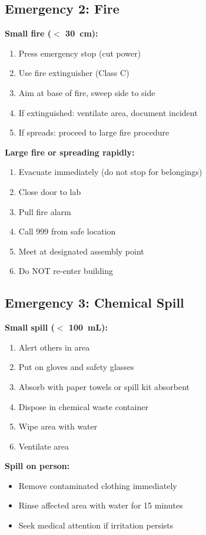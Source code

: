 \documentclass[11pt]{article}
\begin{document}
\subsection{Emergency 2: Fire}

\textbf{Small fire ($<$ 30~cm):}

\begin{enumerate}
\item Press emergency stop (cut power)
\item Use fire extinguisher (Class C)
\item Aim at base of fire, sweep side to side
\item If extinguished: ventilate area, document incident
\item If spreads: proceed to large fire procedure
\end{enumerate}

\textbf{Large fire or spreading rapidly:}

\begin{enumerate}
\item Evacuate immediately (do not stop for belongings)
\item Close door to lab
\item Pull fire alarm
\item Call 999 from safe location
\item Meet at designated assembly point
\item Do NOT re-enter building
\end{enumerate}

\subsection{Emergency 3: Chemical Spill}

\textbf{Small spill ($<$ 100~mL):}

\begin{enumerate}
\item Alert others in area
\item Put on gloves and safety glasses
\item Absorb with paper towels or spill kit absorbent
\item Dispose in chemical waste container
\item Wipe area with water
\item Ventilate area
\end{enumerate}

\textbf{Spill on person:}

\begin{itemize}
\item Remove contaminated clothing immediately
\item Rinse affected area with water for 15 minutes
\item Seek medical attention if irritation persists
\end{itemize}
\end{document}
